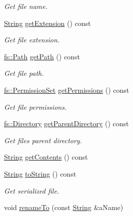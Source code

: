 \begin{DoxyCompactItemize}
\begin{DoxyCompactList}\small\item\em Get file name. \end{DoxyCompactList}\item 
\hyperlink{classlibrary_1_1core_1_1types_1_1_string}{String} \hyperlink{classlibrary_1_1core_1_1fs_1_1_file_acfb85ab6934afc65ecf53a1a08775f84}{get\+Extension} () const
\begin{DoxyCompactList}\small\item\em Get file extension. \end{DoxyCompactList}\item 
\hyperlink{classlibrary_1_1core_1_1fs_1_1_path}{fs\+::\+Path} \hyperlink{classlibrary_1_1core_1_1fs_1_1_file_a70b1380ff844adf37a481bbdb46d11a0}{get\+Path} () const
\begin{DoxyCompactList}\small\item\em Get file path. \end{DoxyCompactList}\item 
\hyperlink{classlibrary_1_1core_1_1fs_1_1_permission_set}{fs\+::\+Permission\+Set} \hyperlink{classlibrary_1_1core_1_1fs_1_1_file_a0addf18f7510955e48fdef2416b98423}{get\+Permissions} () const
\begin{DoxyCompactList}\small\item\em Get file permissions. \end{DoxyCompactList}\item 
\hyperlink{classlibrary_1_1core_1_1fs_1_1_directory}{fs\+::\+Directory} \hyperlink{classlibrary_1_1core_1_1fs_1_1_file_a8eb74097f9bdc9d3c626fe4924bf405e}{get\+Parent\+Directory} () const
\begin{DoxyCompactList}\small\item\em Get file\textquotesingle{}s parent directory. \end{DoxyCompactList}\item 
\hyperlink{classlibrary_1_1core_1_1types_1_1_string}{String} \hyperlink{classlibrary_1_1core_1_1fs_1_1_file_a0a48a4d886d255e53e35511f1519e7fa}{get\+Contents} () const
\item 
\hyperlink{classlibrary_1_1core_1_1types_1_1_string}{String} \hyperlink{classlibrary_1_1core_1_1fs_1_1_file_a891360e0ec67f357b528b3a1827d8c21}{to\+String} () const
\begin{DoxyCompactList}\small\item\em Get serialized file. \end{DoxyCompactList}\item 
void \hyperlink{classlibrary_1_1core_1_1fs_1_1_file_ae65190a612b6958e9e36238e3370c134}{rename\+To} (const \hyperlink{classlibrary_1_1core_1_1types_1_1_string}{String} \&a\+Name)

\end{DoxyCompactItemize}
